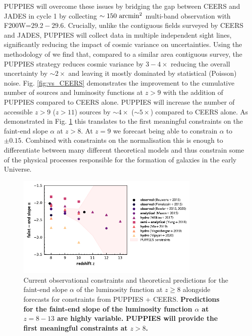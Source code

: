 \documentclass[12pt]{article}
\begin{document}
PUPPIES will overcome these issues by bridging the gap between CEERS and JADES in cycle 1 by collecting $\sim 150\ {\rm arcmin^2}$ multi-band observation with F200W=$29.2-29.6$. Crucially, unlike the contiguous fields surveyed by CEERS and JADES, PUPPIES will collect data in multiple independent sight lines, significantly reducing the impact of cosmic variance on uncertainties. Using the methodology of \citet{2020MNRAS.499.2401T} we find that, compared to a similar area contiguous survey, the PUPPIES strategy reduces cosmic variance by $3-4\times$ reducing the overall uncertainty by $\sim 2\times$ and leaving it mostly dominated by statistical (Poisson) noise. Fig. \ref{fig:vs_CEERS} demonstrates the improvement to the cumulative number of sources and luminosity functions at $z>9$ with the addition of PUPPIES compared to CEERS alone. PUPPIES will increase the number of accessible $z>9$ ($z>11$) sources by $\sim 4\times$ ($\sim 5\times$) compared to CEERS alone. As demonstrated in Fig. \ref{fig:alpha} this translates to the first meaningful constraints on the faint-end slope $\alpha$ at $z>8$. At $z=9$ we forecast being able to constrain $\alpha$ to $\pm 0.15$. Combined with constraints on the normalisation this is enough to differentiate between many different theoretical models and thus constrain some of the physical processes responsible for the formation of galaxies in the early Universe.




\begin{figure}[h!]
    \centering
    \includegraphics[width=0.8\textwidth]{figs/alpha.pdf}
    \vspace{-5mm}
    \caption{Current observational constraints and theoretical predictions for the faint-end slope $\alpha$ of the luminosity function at $z\ge 8$ alongside forecasts for constraints from PUPPIES + CEERS. \textbf{Predictions for the faint-end slope of the luminosity function $\alpha$ at $z=8-13$ are highly variable. PUPPIES will provide the first meaningful constraints at $z>8$.}}
    \label{fig:alpha}
\end{figure}
\end{document}

